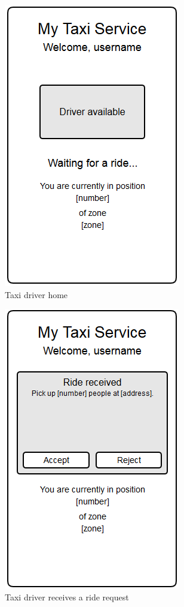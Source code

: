 \begin{figure}
\centering
\includegraphics{tex-images/ui-driver-home}
\caption{Taxi driver home}
\end{figure}

\begin{figure}
\centering
\includegraphics{tex-images/ui-driver-ride}
\caption{Taxi driver receives a ride request}
\end{figure}

